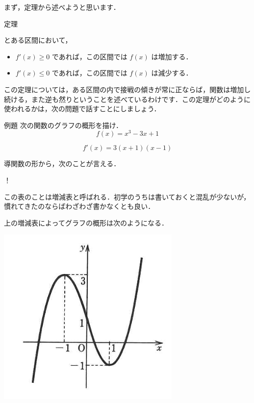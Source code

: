 \documentclass[
  b4paperpaper,
  xelatex,ja=standard]{bxjsbook}
\providecommand{\tightlist}{%
  \setlength{\itemsep}{0pt}\setlength{\parskip}{0pt}}\usepackage{longtable,booktabs,array}
\begin{document}
まず，定理から述べようと思います．

\begin{Tbox}{定理}

とある区間において，

\begin{itemize}
\tightlist
\item
  \(f'(x) \geq 0\) であれば，この区間では \(f(x)\) は増加する．
\item
  \(f'(x) \leq 0\) であれば，この区間では \(f(x)\) は減少する．
\end{itemize}

\end{Tbox}

この定理については，ある区間の内で接戦の傾きが常に正ならば，関数は増加し続ける，また逆も然りということを述べているわけです．この定理がどのように使われるかは，次の問題で話すことにしましょう．

\begin{Rbox}{例題}
次の関数のグラフの概形を描け． \[f(x)=x^3-3x+1\]

\end{Rbox}


\[f'(x)=3(x+1)(x-1)\]

導関数の形から，次のことが言える．

！\href{images/intro/intro-2.png}{}

この表のことは増減表と呼ばれる．初学のうちは書いておくと混乱が少ないが，慣れてきたのならばわざわざ書かなくとも良い．

上の増減表によってグラフの概形は次のようになる．

\includegraphics{source/images/intro/intro-3.png}
\end{document}
